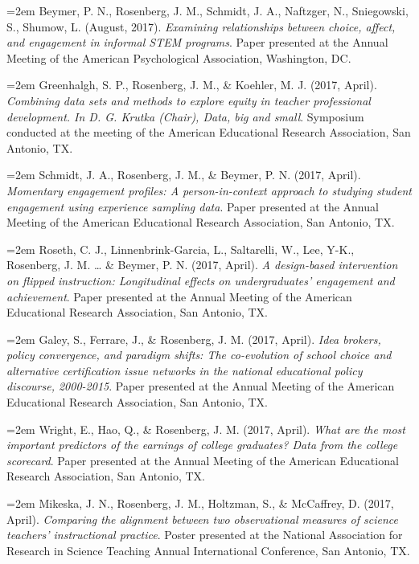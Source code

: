 \documentclass[]{article}
\begin{document}
\hangindent=2em Beymer, P. N., Rosenberg, J. M., Schmidt, J. A.,
Naftzger, N., Sniegowski, S., Shumow, L. (August, 2017). \emph{Examining
relationships between choice, affect, and engagement in informal STEM
programs}. Paper presented at the Annual Meeting of the American
Psychological Association, Washington, DC.

\hangindent=2em Greenhalgh, S. P., Rosenberg, J. M., \& Koehler, M. J.
(2017, April). \emph{Combining data sets and methods to explore equity
in teacher professional development. In D. G. Krutka (Chair), Data, big
and small}. Symposium conducted at the meeting of the American
Educational Research Association, San Antonio, TX.

\hangindent=2em Schmidt, J. A., Rosenberg, J. M., \& Beymer, P. N.
(2017, April). \emph{Momentary engagement profiles: A person-in-context
approach to studying student engagement using experience sampling data}.
Paper presented at the Annual Meeting of the American Educational
Research Association, San Antonio, TX.

\hangindent=2em Roseth, C. J., Linnenbrink-Garcia, L., Saltarelli, W.,
Lee, Y-K., Rosenberg, J. M. \ldots{} \& Beymer, P. N. (2017, April).
\emph{A design-based intervention on flipped instruction: Longitudinal
effects on undergraduates' engagement and achievement}. Paper presented
at the Annual Meeting of the American Educational Research Association,
San Antonio, TX.

\hangindent=2em Galey, S., Ferrare, J., \& Rosenberg, J. M. (2017,
April). \emph{Idea brokers, policy convergence, and paradigm shifts: The
co-evolution of school choice and alternative certification issue
networks in the national educational policy discourse, 2000-2015}. Paper
presented at the Annual Meeting of the American Educational Research
Association, San Antonio, TX.

\hangindent=2em Wright, E., Hao, Q., \& Rosenberg, J. M. (2017, April).
\emph{What are the most important predictors of the earnings of college
graduates? Data from the college scorecard}. Paper presented at the
Annual Meeting of the American Educational Research Association, San
Antonio, TX.

\hangindent=2em Mikeska, J. N., Rosenberg, J. M., Holtzman, S., \&
McCaffrey, D. (2017, April). \emph{Comparing the alignment between two
observational measures of science teachers' instructional practice}.
Poster presented at the National Association for Research in Science
Teaching Annual International Conference, San Antonio, TX.
\end{document}
